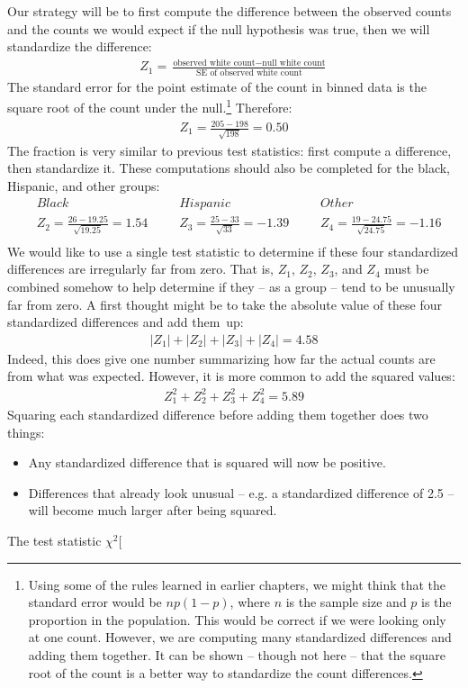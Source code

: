 Our strategy will be to first compute the difference between the observed counts and the counts we would expect if the null hypothesis was true, then we will standardize the difference:
\begin{align*}
Z_{1} = \frac{\text{observed white count} - \text{null white count}}
				{\text{SE of observed white count}}
\end{align*}
The standard error for the point estimate of the count in binned data is the square root of the count under the null.\footnote{Using some of the rules learned in earlier chapters, we might think that the standard error would be $np(1-p)$, where $n$ is the sample size and $p$ is the proportion in the population. This would be correct if we were looking only at one count. However, we are computing many standardized differences and adding them together. It can be shown -- though not here -- that the square root of the count is a better way to standardize the count differences.} Therefore:
\begin{align*}
Z_1 = \frac{205 - 198}{\sqrt{198}} = 0.50
\end{align*}
The fraction is very similar to previous test statistics: first compute a difference, then standardize it. These computations should also be completed for the black, Hispanic, and other groups:
\begin{align*}
&Black && Hispanic	&&Other \\
& Z_2 = \frac{26-19.25}{\sqrt{19.25}}=1.54\ \ \ \ 
	&& Z_3 = \frac{25-33}{\sqrt{33}}=-1.39\ \ \ \ 
	&& Z_4 = \frac{19-24.75}{\sqrt{24.75}}=-1.16 \\
\end{align*}
We would like to use a single test statistic to determine if these four standardized differences are irregularly far from zero. That is, $Z_1$, $Z_2$, $Z_3$, and $Z_4$ must be combined somehow to help determine if they -- as a group -- tend to be unusually far from zero. A first thought might be to take the absolute value of these four standardized differences and add them~up:
\begin{align*}
|Z_1| + |Z_2| + |Z_3| + |Z_4| = 4.58
\end{align*}
Indeed, this does give one number summarizing how far the actual counts are from what was expected. However, it is more common to add the squared values:
\begin{align*}
Z_1^2 + Z_2^2 + Z_3^2 + Z_4^2 = 5.89
\end{align*}
Squaring each standardized difference before adding them together does two things:
\begin{itemize}
\setlength{\itemsep}{0mm}
\item Any standardized difference that is squared will now be positive.
\item Differences that already look unusual -- e.g. a standardized difference of 2.5 -- will become much larger after being squared.
\end{itemize}
The test statistic $\chi^2$\marginpar[\raggedright\vspace{9mm}

